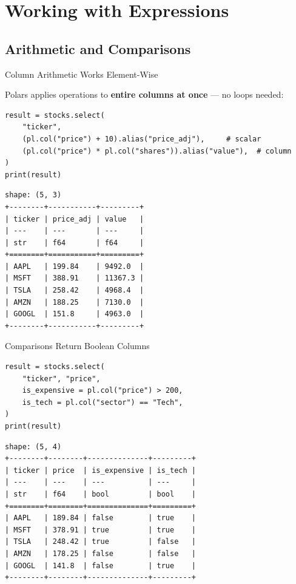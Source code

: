 \documentclass[9pt,aspectratio=169]{beamer}
\begin{document}
\section{Working with Expressions}
\subsection{Arithmetic and Comparisons}

\begin{frame}[fragile]{Column Arithmetic Works Element-Wise}

Polars applies operations to \textbf{entire columns at once} --- no loops needed:

\begin{lstlisting}
result = stocks.select(
    "ticker",
    (pl.col("price") + 10).alias("price_adj"),     # scalar
    (pl.col("price") * pl.col("shares")).alias("value"),  # column
)
print(result)
\end{lstlisting}

\begin{lstlisting}[style=output]
shape: (5, 3)
+--------+-----------+---------+
| ticker | price_adj | value   |
| ---    | ---       | ---     |
| str    | f64       | f64     |
+========+===========+=========+
| AAPL   | 199.84    | 9492.0  |
| MSFT   | 388.91    | 11367.3 |
| TSLA   | 258.42    | 4968.4  |
| AMZN   | 188.25    | 7130.0  |
| GOOGL  | 151.8     | 4963.0  |
+--------+-----------+---------+
\end{lstlisting}

\end{frame}


\begin{frame}[fragile]{Comparisons Return Boolean Columns}

\begin{lstlisting}
result = stocks.select(
    "ticker", "price",
    is_expensive = pl.col("price") > 200,
    is_tech = pl.col("sector") == "Tech",
)
print(result)
\end{lstlisting}

\begin{lstlisting}[style=output]
shape: (5, 4)
+--------+--------+--------------+---------+
| ticker | price  | is_expensive | is_tech |
| ---    | ---    | ---          | ---     |
| str    | f64    | bool         | bool    |
+========+========+==============+=========+
| AAPL   | 189.84 | false        | true    |
| MSFT   | 378.91 | true         | true    |
| TSLA   | 248.42 | true         | false   |
| AMZN   | 178.25 | false        | false   |
| GOOGL  | 141.8  | false        | true    |
+--------+--------+--------------+---------+
\end{lstlisting}

\end{frame}
\end{document}
